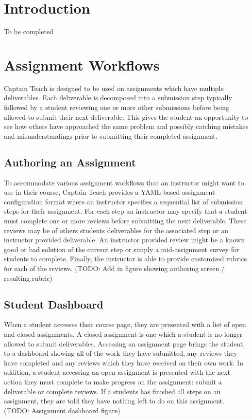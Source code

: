 \documentclass{sig-alternate}
\begin{document}

\section{Introduction}
To be completed


\section{Assignment Workflows}
Captain Teach is designed to be used on assignments which have multiple
deliverables. Each deliverable is decomposed into a submission step typically
followed by a student reviewing one or more other submissions before being
allowed to submit their next deliverable. This gives the student an
opportunity to see how others have approached the same problem and possibly
catching mistakes and misunderstandings prior to submitting their completed
assignment.

\subsection{Authoring an Assignment}
To accommodate various assignment workflows that an instructor might want to use
in their course, Captain Teach provides a YAML based assignment configuration 
format where an instructor specifies a sequential list of submission steps for 
their  assignment. For each step an instructor may specify that a 
student must complete one or more reviews before submitting the next deliverable.
These reviews may be of others students deliverables for the associated step or 
an instructor provided deliverable. An instructor provided review might be a
known good or bad solution of the current step or simply a mid-assignment 
survey for students to complete. Finally, the instructor is able to provide
customized rubrics for each of the reviews. (TODO: Add in figure showing authoring screen / resulting rubric)


\subsection{Student Dashboard}
When a student accesses their course page, they are presented with a list of
open and closed assignments. A closed assignment is one which a student
is no longer allowed to submit deliverables.
Accessing an assignment page brings the student,
to a dashboard showing all of the work they have submitted, any reviews
they have completed and any reviews which they have received on their own work.
In addition, a student accessing an open assignment is presented with the next
action they must complete to make progress on the assignment: submit a 
deliverable or complete reviews. If a students has finished all steps on an
assignment, they are told they have nothing left to do on this assignment. (TODO: Assignment dashboard figure)
\end{document}
